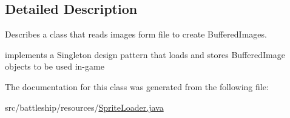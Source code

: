 \subsection{Detailed Description}
Describes a class that reads images form file to create Buffered\+Images. 

implements a Singleton design pattern that loads and stores Buffered\+Image objects to be used in-\/game 

The documentation for this class was generated from the following file\+:\begin{DoxyCompactItemize}
\item 
src/battleship/resources/\hyperlink{SpriteLoader_8java}{Sprite\+Loader.\+java}\end{DoxyCompactItemize}
